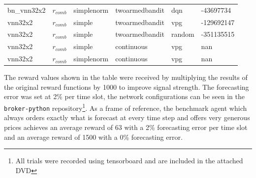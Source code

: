 \begin{table}[]
{\begin{tabular}{l|l|l|l|l|l}
            bn\_vnn32x2      &       $r_{comb}$       &       simplenorm             &   twoarmedbandit     & dqn                  & -43697734  \\
            vnn32x2          &       $r_{comb}$       &       simple                 &   twoarmedbandit     & vpg                  & -129692147 \\
            vnn32x2          &       $r_{comb}$       &       simple                 &   twoarmedbandit     & random               & -351135515 \\
            vnn32x2          &       $r_{comb}$       &       simple                 &   continuous         & vpg                  & nan        \\
            vnn32x2          &       $r_{comb}$       &       simplenorm             &   continuous         & vpg                  & nan        \\

        \end{tabular}
    }
\end{table}
The reward values shown in the table were received by multiplying the results of the original reward functions by 1000
to improve signal strength. The forecasting error was set at 2\% per time slot, the network configurations can be seen in
the \texttt{broker-python} repository\footnote{All trials were recorded using tensorboard and are included in the
attached DVD}.
As a frame of reference, the benchmark agent which always orders exactly what is forecast at every time step and offers
very generous prices achieves an average reward of 63 with a 2\% forecasting error per time slot and an average reward
of 1500 with a 0\% forecasting error.

